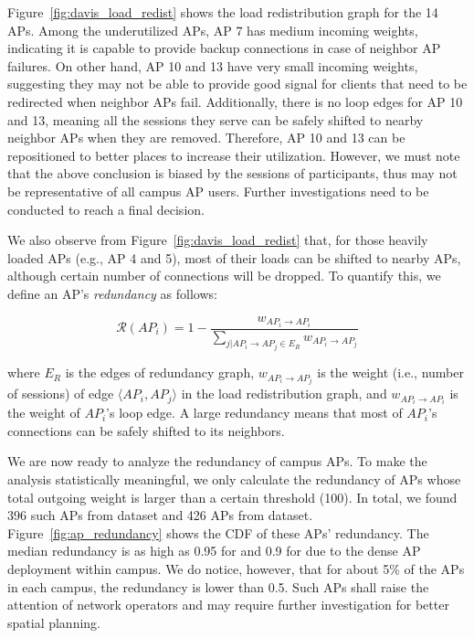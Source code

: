 Figure~\ref{fig:davis_load_redist} shows the load redistribution graph for the
14 APs. Among the underutilized APs, AP 7 has medium 
incoming weights, indicating it is capable to provide backup connections
in case of neighbor AP failures. On other hand, AP 10 and 13 have very small incoming
weights, suggesting they may not be able to provide good signal for clients
that need to be redirected when neighbor APs fail. Additionally, there is no loop edges for
AP 10 and 13, meaning all the \wifi{} sessions they serve can be safely shifted to
nearby neighbor APs when they are removed. Therefore, AP 10 and 13 can be
repositioned to better places to increase their utilization. However, we must
note that the above conclusion is biased by the \wifi{} sessions of \PhoneLab{}
participants, thus may not be representative of all campus AP users. Further
investigations need to be conducted to reach a final decision.

We also observe from Figure~\ref{fig:davis_load_redist} that, for those heavily
loaded APs (e.g., AP 4 and 5), most of their loads can be shifted to nearby APs,
although certain number of connections will be dropped. To quantify this, we define an
AP's \textit{redundancy} as follows:

\begin{equation}
  \mathcal{R}(AP_i) = 1 - \frac{w_{AP_i \rightarrow AP_i}}{\sum_{j|AP_i \rightarrow
    AP_j \in E_R} w_{AP_i \rightarrow AP_j}}
\end{equation}

where $E_R$ is the edges of redundancy graph, $w_{AP_i \rightarrow AP_j}$ is the
weight (i.e., number of sessions) of edge $\langle AP_i, AP_j\rangle$ in the
load redistribution graph, and $w_{AP_i \rightarrow AP_i}$ is the weight of
$AP_i$'s loop edge. A large redundancy means that most of $AP_i$'s connections
can be safely shifted to its neighbors.

We are now ready to analyze the redundancy of campus APs. To make the analysis
statistically meaningful, we only calculate the redundancy of APs whose total
outgoing weight is larger than a certain threshold (100). In total, we found
396 such APs from \ubscan{} dataset and 426 APs from \ndscan{} dataset.
Figure~\ref{fig:ap_redundancy} shows the CDF of these APs' redundancy. The
median redundancy is as high as 0.95 for \ub{} and 0.9 for \nd{} due to the dense AP
deployment within campus. We do notice, however, that for about 5\% of the APs in
each campus, the redundancy is lower than 0.5. Such APs shall raise the attention of network
operators and may require further investigation for better spatial planning.



